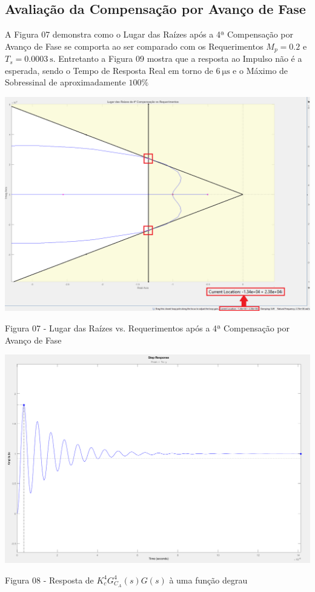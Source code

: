 \documentclass[a4paper]{article}
\begin{document}
 \subsection{Avaliação da Compensação por Avanço de Fase}
 \par A Figura 07 demonstra como o Lugar das Raízes após a 4ª Compensação por Avanço de Fase se comporta ao ser comparado com os Requerimentos $M_p = 0.2$ e $T_s = \SI{0.0003}{\second}$. Entretanto a Figura 09 mostra que a resposta ao Impulso não é a esperada, sendo o Tempo de Resposta Real em torno de $\SI{6}{\micro\second}$ e o Máximo de Sobressinal de aproximadamente $100\%$
 \begin{center}
 	\includegraphics[width=40em,keepaspectratio]{lugar_das_raizes_1_compensacao_requerimentos}
 	\par Figura 07 - Lugar das Raízes vs. Requerimentos após a 4ª Compensação por Avanço de Fase
 \end{center}
\begin{center}
	\includegraphics[width=40em,keepaspectratio]{lugar_das_raizes_19_compensacao_requerimentos}
	\par Figura 08 - Resposta de $K_c^4G_{C_A}^4(s)G(s)$ à uma função degrau
\end{center}
\vspace{0.5em}
 \vspace{0.5em}
 
\end{document}
